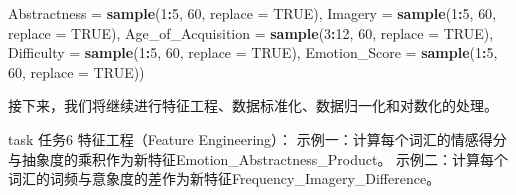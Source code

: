 \documentclass[]{book}
\newenvironment{Shaded}{\begin{snugshade}}{\end{snugshade}}
\newcommand{\CommentTok}[1]{\textcolor[rgb]{0.56,0.35,0.01}{\textit{#1}}}
\newcommand{\DataTypeTok}[1]{\textcolor[rgb]{0.13,0.29,0.53}{#1}}
\newcommand{\DecValTok}[1]{\textcolor[rgb]{0.00,0.00,0.81}{#1}}
\newcommand{\KeywordTok}[1]{\textcolor[rgb]{0.13,0.29,0.53}{\textbf{#1}}}
\newcommand{\NormalTok}[1]{#1}
\newcommand{\OperatorTok}[1]{\textcolor[rgb]{0.81,0.36,0.00}{\textbf{#1}}}
\newcommand{\OtherTok}[1]{\textcolor[rgb]{0.56,0.35,0.01}{#1}}
\newcommand{\StringTok}[1]{\textcolor[rgb]{0.31,0.60,0.02}{#1}}
\begin{document}
\begin{Shaded}
\begin{Highlighting}[]
                        \DataTypeTok{Abstractness =} \KeywordTok{sample}\NormalTok{(}\DecValTok{1}\OperatorTok{:}\DecValTok{5}\NormalTok{, }\DecValTok{60}\NormalTok{, }\DataTypeTok{replace =} \OtherTok{TRUE}\NormalTok{),}
                        \DataTypeTok{Imagery =} \KeywordTok{sample}\NormalTok{(}\DecValTok{1}\OperatorTok{:}\DecValTok{5}\NormalTok{, }\DecValTok{60}\NormalTok{, }\DataTypeTok{replace =} \OtherTok{TRUE}\NormalTok{),}
                        \DataTypeTok{Age_of_Acquisition =} \KeywordTok{sample}\NormalTok{(}\DecValTok{3}\OperatorTok{:}\DecValTok{12}\NormalTok{, }\DecValTok{60}\NormalTok{, }\DataTypeTok{replace =} \OtherTok{TRUE}\NormalTok{),}
                        \DataTypeTok{Difficulty =} \KeywordTok{sample}\NormalTok{(}\DecValTok{1}\OperatorTok{:}\DecValTok{5}\NormalTok{, }\DecValTok{60}\NormalTok{, }\DataTypeTok{replace =} \OtherTok{TRUE}\NormalTok{),}
                        \DataTypeTok{Emotion_Score =} \KeywordTok{sample}\NormalTok{(}\DecValTok{1}\OperatorTok{:}\DecValTok{5}\NormalTok{, }\DecValTok{60}\NormalTok{, }\DataTypeTok{replace =} \OtherTok{TRUE}\NormalTok{))}
\end{Highlighting}
\end{Shaded}

接下来，我们将继续进行特征工程、数据标准化、数据归一化和对数化的处理。

\begin{infobox}task
任务6 特征工程（Feature Engineering）：
示例一：计算每个词汇的情感得分与抽象度的乘积作为新特征Emotion\_Abstractness\_Product。
示例二：计算每个词汇的词频与意象度的差作为新特征Frequency\_Imagery\_Difference。

\end{infobox}

\begin{Shaded}
\end{Shaded}
\end{document}
